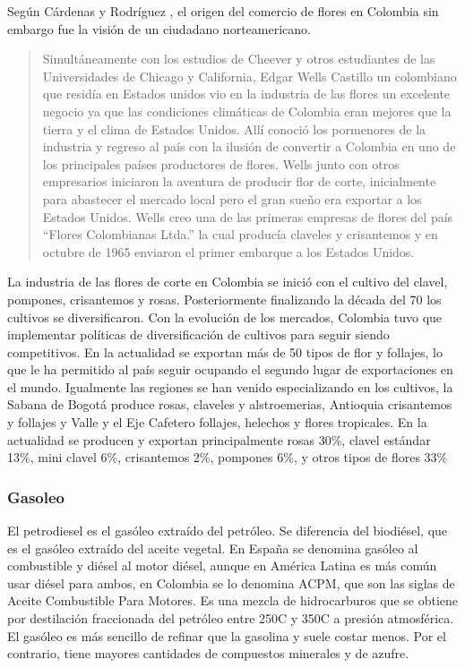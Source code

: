 Según Cárdenas y Rodríguez \cite{cardenasRodriguez}, el origen del comercio de flores en Colombia sin embargo fue la visión de un ciudadano norteamericano.

\begin{quote}
Simultáneamente con los estudios de Cheever y otros estudiantes de las Universidades de Chicago y California, Edgar Wells Castillo un colombiano que residía en Estados unidos vio en la industria de las flores un excelente negocio ya que las condiciones climáticas de Colombia eran mejores que la tierra  y  el  clima de Estados Unidos. Allí conoció los pormenores de la industria y regreso al país con la ilusión de convertir a Colombia en uno de los principales países productores de flores. Wells junto con otros empresarios iniciaron la aventura de producir flor de corte, inicialmente para abastecer el mercado local pero el gran sueño era exportar a los Estados Unidos. Wells creo una de las primeras empresas de flores del país “Flores  Colombianas  Ltda.” la cual producía claveles y crisantemos y en octubre de 1965 enviaron el primer embarque a los Estados Unidos.
\end{quote}

La industria de las flores de corte en Colombia se inició con el cultivo del clavel, pompones, crisantemos y rosas. Posteriormente finalizando la década del  70 los cultivos se diversificaron. Con la evolución de los mercados, Colombia  tuvo que implementar políticas de diversificación de cultivos para seguir siendo  competitivos.  En  la  actualidad  se  exportan  más  de  50  tipos  de  flor  y  follajes,  lo  que  le  ha  permitido  al  país  seguir  ocupando el segundo lugar de exportaciones en el mundo. Igualmente  las  regiones  se  han  venido  especializando  en  los  cultivos, la Sabana de Bogotá produce rosas, claveles y alstroemerias, Antioquia crisantemos y follajes y Valle y el Eje Cafetero  follajes, helechos y flores tropicales. En la actualidad se producen y  exportan  principalmente rosas 30\%, clavel estándar 13\%, mini clavel 6\%, crisantemos 2\%, pompones 6\%, y otros tipos de flores 33\% \cite{cardenasRodriguez}

\subsubsection{Gasoleo}
El petrodiesel es el gasóleo extraído del petróleo. Se diferencia del biodiésel, que es el gasóleo extraído del aceite vegetal. En España se denomina gasóleo al combustible y diésel al motor diésel, aunque en América Latina es más común usar diésel para ambos, en Colombia se lo denomina ACPM, que son las siglas de Aceite Combustible Para Motores. Es una mezcla de hidrocarburos que se obtiene por destilación fraccionada del petróleo entre 250C y 350C a presión atmosférica. El gasóleo es más sencillo de refinar que la gasolina y suele costar menos. Por el contrario, tiene mayores cantidades de compuestos minerales y de azufre.

